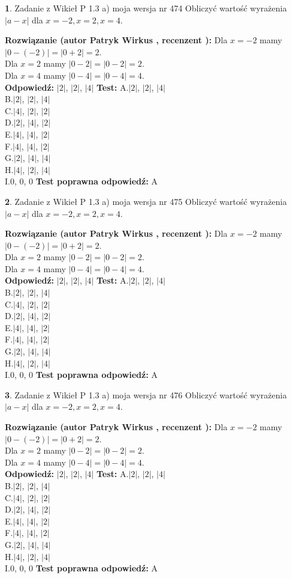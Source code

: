 \documentclass[12pt, a4paper]{article}
\theoremstyle{definition} %
\newtheorem{zad}{}
\newcommand{\zadStart}[1]{\begin{zad}#1\newline}
\newcommand{\zadStop}{\end{zad}}
\newcommand{\rozwStart}[2]{\noindent \textbf{Rozwiązanie (autor #1 , recenzent #2): }\newline}
\newcommand{\rozwStop}{\newline}
\newcommand{\odpStart}{\noindent \textbf{Odpowiedź:}\newline}
\newcommand{\odpStop}{\newline}
\newcommand{\testStart}{\noindent \textbf{Test:}\newline}
\newcommand{\testStop}{\newline}
\newcommand{\kluczStart}{\noindent \textbf{Test poprawna odpowiedź:}\newline}
\newcommand{\kluczStop}{\newline}
\begin{document}
\zadStart{Zadanie z Wikieł P 1.3 a) moja wersja nr 474}
Obliczyć wartość wyrażenia $|a - x|$ dla $x=-2,x=2,x=4$.
\zadStop
\rozwStart{Patryk Wirkus}{}
Dla $x = -2$ mamy $|0 - (-2)| = |0 + 2| = 2$.\\
Dla $x = 2$ mamy $|0 - 2| = |0 - 2| = 2$.\\
Dla $x = 4$ mamy $|0 - 4| = |0 - 4| = 4$.\\
\rozwStop
\odpStart
$|2|$, $|2|$, $|4|$
\odpStop
\testStart
A.$|2|$, $|2|$, $|4|$\\
B.$|2|$, $|2|$, $|4|$\\
C.$|4|$, $|2|$, $|2|$\\
D.$|2|$, $|4|$, $|2|$\\
E.$|4|$, $|4|$, $|2|$\\
F.$|4|$, $|4|$, $|2|$\\
G.$|2|$, $|4|$, $|4|$\\
H.$|4|$, $|2|$, $|4|$\\
I.$0$, $0$, $0$
\testStop
\kluczStart
A
\kluczStop



\zadStart{Zadanie z Wikieł P 1.3 a) moja wersja nr 475}
Obliczyć wartość wyrażenia $|a - x|$ dla $x=-2,x=2,x=4$.
\zadStop
\rozwStart{Patryk Wirkus}{}
Dla $x = -2$ mamy $|0 - (-2)| = |0 + 2| = 2$.\\
Dla $x = 2$ mamy $|0 - 2| = |0 - 2| = 2$.\\
Dla $x = 4$ mamy $|0 - 4| = |0 - 4| = 4$.\\
\rozwStop
\odpStart
$|2|$, $|2|$, $|4|$
\odpStop
\testStart
A.$|2|$, $|2|$, $|4|$\\
B.$|2|$, $|2|$, $|4|$\\
C.$|4|$, $|2|$, $|2|$\\
D.$|2|$, $|4|$, $|2|$\\
E.$|4|$, $|4|$, $|2|$\\
F.$|4|$, $|4|$, $|2|$\\
G.$|2|$, $|4|$, $|4|$\\
H.$|4|$, $|2|$, $|4|$\\
I.$0$, $0$, $0$
\testStop
\kluczStart
A
\kluczStop



\zadStart{Zadanie z Wikieł P 1.3 a) moja wersja nr 476}
Obliczyć wartość wyrażenia $|a - x|$ dla $x=-2,x=2,x=4$.
\zadStop
\rozwStart{Patryk Wirkus}{}
Dla $x = -2$ mamy $|0 - (-2)| = |0 + 2| = 2$.\\
Dla $x = 2$ mamy $|0 - 2| = |0 - 2| = 2$.\\
Dla $x = 4$ mamy $|0 - 4| = |0 - 4| = 4$.\\
\rozwStop
\odpStart
$|2|$, $|2|$, $|4|$
\odpStop
\testStart
A.$|2|$, $|2|$, $|4|$\\
B.$|2|$, $|2|$, $|4|$\\
C.$|4|$, $|2|$, $|2|$\\
D.$|2|$, $|4|$, $|2|$\\
E.$|4|$, $|4|$, $|2|$\\
F.$|4|$, $|4|$, $|2|$\\
G.$|2|$, $|4|$, $|4|$\\
H.$|4|$, $|2|$, $|4|$\\
I.$0$, $0$, $0$
\testStop
\kluczStart
A
\kluczStop
\end{document}
